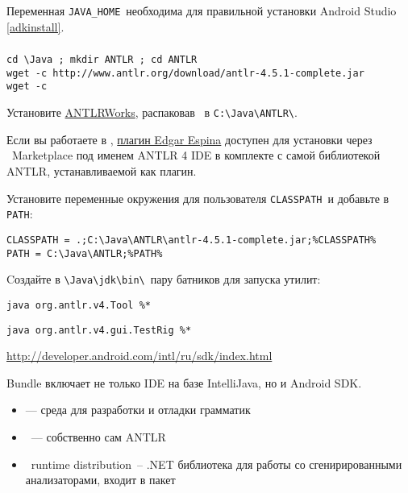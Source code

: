 Переменная \verb|JAVA_HOME|\ необходима для правильной установки
Android Studio \ref{adkinstall}.


\subsubsection{\win}

\begin{verbatim}
cd \Java ; mkdir ANTLR ; cd ANTLR
wget -c http://www.antlr.org/download/antlr-4.5.1-complete.jar
wget -c 
\end{verbatim}

Установите \href{http://tunnelvisionlabs.com/products/demo/antlrworks}{ANTLRWorks},
распаковав \ в \verb|C:\Java\ANTLR\|.
\bigskip

Если вы работаете в \eclipse, 
\href{https://github.com/jknack/antlr4ide}{плагин Edgar Espina}
доступен для установки через \eclipse\ Marketplace под именем
ANTLR 4 IDE в комплекте с самой библиотекой ANTLR, устанавливаемой как плагин.
\bigskip

Установите переменные окружения для пользователя \verb|CLASSPATH|\ и добавьте в \verb|PATH|:

\begin{verbatim}
CLASSPATH = .;C:\Java\ANTLR\antlr-4.5.1-complete.jar;%CLASSPATH%
PATH = C:\Java\ANTLR;%PATH%
\end{verbatim}

Cоздайте в \verb|\Java\jdk\bin\|\ пару батников для запуска утилит:

\begin{lstlisting}[title=\file{antlr4.bat}]
java org.antlr.v4.Tool %*
\end{lstlisting}
\begin{lstlisting}[title=\file{grun.bat}]
java org.antlr.v4.gui.TestRig %*
\end{lstlisting}

\label{adkinstall}

\url{http://developer.android.com/intl/ru/sdk/index.html}\bigskip


\bigskip
Bundle включает не только IDE на базе IntelliJava, но и Android SDK.

\secup


\begin{itemize}[nosep]
\item {} --- среда для разработки и отладки грамматик
\item {}\ --- собственно сам ANTLR
\item {} \cs\ runtime distribution\ -- .NET библиотека 
для работы со сгенирированными анализаторами, входит в пакет 
\end{itemize}

\secup
